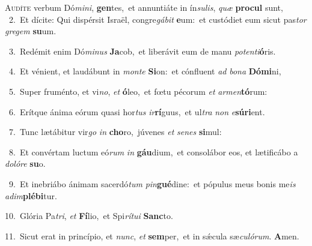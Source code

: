 \lettrine{\initial\textcolor{\initialcolor}{A}}{udíte} verbum Dó\-\textit{mi}\-\textit{ni}, \textbf{gen}\-tes,~\star et annuntiáte in ín\-\textit{su}\-\textit{lis}, \textit{quæ} \textbf{pro}\-\textbf{cul} sunt,\\
{\numbfont\textcolor{\numbcolor}{~2.}}~Et dícite: Qui dispérsit Israël, congre\-\textit{gá}\-\textit{bit} \textbf{e}\-um:~\star et custódiet eum sicut pas\textit{tor} \textit{gre}\-\textit{gem} \textbf{su}\-um.\par
{\numbfont\textcolor{\numbcolor}{~3.}}~Redémit enim Dó\-\textit{mi}\-\textit{nus} \textbf{Ja}\-cob,~\star et liberávit eum de manu \textit{pot}\-\textit{en}\textit{ti}\textbf{ó}ris.\par
{\numbfont\textcolor{\numbcolor}{~4.}}~Et vénient, et laudábunt in \textit{mon}\-\textit{te} \textbf{Si}\-on:~\star et cónfluent \textit{ad} \textit{bo}\-\textit{na} \textbf{Dó}\-\textbf{mi}ni,\par
{\numbfont\textcolor{\numbcolor}{~5.}}~Super fruménto, et vi\-\textit{no}\-, \textit{et} \textbf{ó}\-leo,~\star et fœtu pécorum \textit{et} \textit{ar}\-\textit{men}\textbf{tó}rum:\par
{\numbfont\textcolor{\numbcolor}{~6.}}~Erítque ánima eórum quasi hor\textit{tus} \textit{ir}\-\textbf{rí}guus,~\star et ul\textit{tra} \textit{non} \textit{e}\-\textbf{sú}\textbf{ri}ent.\par
{\numbfont\textcolor{\numbcolor}{~7.}}~Tunc lætábitur vir\textit{go} \textit{in} \textbf{cho}\-ro,~\star júvenes \textit{et} \textit{se}\-\textit{nes} \textbf{si}\-mul:\par
{\numbfont\textcolor{\numbcolor}{~8.}}~Et convértam luctum eó\textit{rum} \textit{in} \textbf{gáu}\-dium,~\star et consolábor eos, et lætificábo a \textit{do}\-\textit{ló}\textit{re} \textbf{su}\-o.\par
{\numbfont\textcolor{\numbcolor}{~9.}}~Et inebriábo ánimam sacerdó\textit{tum} \textit{pin}\-\textbf{gué}dine:~\star et pópulus meus bonis me\textit{is} \textit{ad}\-\textit{im}\textbf{plé}\textbf{bi}tur.\par
{\numbfont\textcolor{\numbcolor}{10.}}~Glória Pa\-\textit{tri}\-, \textit{et} \textbf{Fí}\-lio,~\star et Spi\-\textit{rí}\-\textit{tu}\textit{i} \textbf{Sanc}\-to.\par
{\numbfont\textcolor{\numbcolor}{11.}}~Sicut erat in princípio, et \textit{nunc}\-, \textit{et} \textbf{sem}\-per,~\star et in sǽcula sæ\-\textit{cu}\-\textit{ló}\textit{rum}. \textbf{A}\-men.\par
